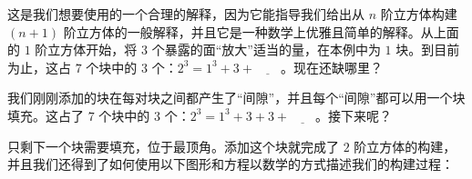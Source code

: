 这是我们想要使用的一个合理的解释，因为它能指导我们给出从 $n$ 阶立方体构建 $(n+1)$ 阶立方体的一般解释，并且它是一种数学上优雅且简单的解释。从上面的 $1$ 阶立方体开始，将 $3$ 个暴露的面“放大”适当的量，在本例中为 $1$ 块。到目前为止，这占 $7$ 个块中的 $3$ 个：$2^3 = 1^3+3+\underline{\qquad}$。现在还缺哪里？

\begin{center}
\end{center}

我们刚刚添加的块在每对块之间都产生了“间隙”，并且每个“间隙”都可以用一个块填充。这占了 $7$ 个块中的 $3$ 个：$2^3 = 1^3+3+3+\underline{\qquad}$。接下来呢？

\begin{center}
\end{center}

只剩下一个块需要填充，位于最顶角。添加这个块就完成了 $2$ 阶立方体的构建，并且我们还得到了如何使用以下图形和方程以数学的方式描述我们的构建过程：

